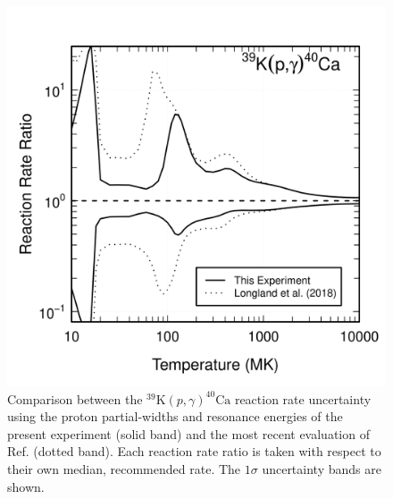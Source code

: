 \begin{figure}[t]
\includegraphics[width=6.5in]{Chapter-6/figs/uncCompare.png} %
\caption{\label{fig:uncCompare}Comparison between the $^{39}\mathrm{K}(p, \gamma)^{40}\mathrm{Ca}$ reaction rate uncertainty using the proton partial-widths and resonance energies of the present experiment (solid band) and the most recent evaluation of Ref. \cite{Longland2018} (dotted band). Each reaction rate ratio is taken with respect to their own median, recommended rate. The $1\sigma$ uncertainty bands are shown.}
\end{figure}

